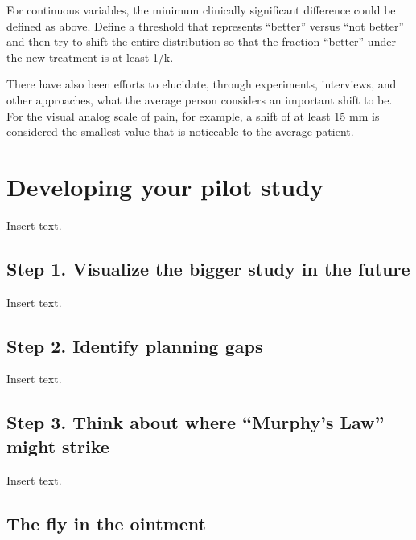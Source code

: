 \documentclass[
  letterpaper,
  DIV=11,
  numbers=noendperiod]{scrreprt}
\begin{document}
For continuous variables, the minimum clinically significant difference
could be defined as above. Define a threshold that represents ``better''
versus ``not better'' and then try to shift the entire distribution so
that the fraction ``better'' under the new treatment is at least 1/k.

There have also been efforts to elucidate, through experiments,
interviews, and other approaches, what the average person considers an
important shift to be. For the visual analog scale of pain, for example,
a shift of at least 15 mm is considered the smallest value that is
noticeable to the average patient.


\hypertarget{developing-your-pilot-study}{%
\chapter{Developing your pilot
study}\label{developing-your-pilot-study}}

Insert text.

\hypertarget{step-1.-visualize-the-bigger-study-in-the-future}{%
\section{Step 1. Visualize the bigger study in the
future}\label{step-1.-visualize-the-bigger-study-in-the-future}}

Insert text.

\hypertarget{step-2.-identify-planning-gaps}{%
\section{Step 2. Identify planning
gaps}\label{step-2.-identify-planning-gaps}}

Insert text.

\hypertarget{step-3.-think-about-where-murphys-law-might-strike}{%
\section{Step 3. Think about where ``Murphy's Law'' might
strike}\label{step-3.-think-about-where-murphys-law-might-strike}}

Insert text.

\hypertarget{the-fly-in-the-ointment-3}{%
\section{The fly in the ointment}\label{the-fly-in-the-ointment-3}}
\end{document}
